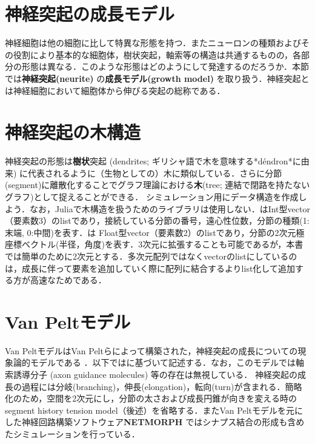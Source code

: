 \section{神経突起の成長モデル}
神経細胞は他の細胞に比して特異な形態を持つ．またニューロンの種類およびその役割により基本的な細胞体，樹状突起，軸索等の構造は共通するものの，各部分の形態は異なる．このような形態はどのようにして発達するのだろうか．本節では\textbf{神経突起(neurite)} の\textbf{成長モデル(growth model)} を取り扱う．神経突起とは神経細胞において細胞体から伸びる突起の総称である．
\section{神経突起の木構造}
神経突起の形態は\textbf{樹状}突起 (dendrites; ギリシャ語で木を意味する*déndron*に由来) に代表されるように（生物としての）木に類似している．さらに分節(segment)に離散化することでグラフ理論における\textbf{木}(tree; 連結で閉路を持たないグラフ)として捉えることができる．
シミュレーション用にデータ構造を作成しよう．なお，Juliaで木構造を扱うためのライブラリは使用しない．はInt型vector（要素数3）のlistであり，接続している分節の番号，遠心性位数，分節の種類(1: 末端, 0:中間)を表す．は Float型vector（要素数2）のlistであり，分節の2次元極座標ベクトル(半径，角度)を表す．3次元に拡張することも可能であるが，本書では簡単のために2次元とする．多次元配列ではなくvectorのlistにしているのは，成長に伴って要素を追加していく際に配列に結合するよりlist化して追加する方が高速なためである．
\section{Van Peltモデル}
Van PeltモデルはVan Peltらによって構築された，神経突起の成長についての現象論的モデルである \citep{Van_Pelt2002-vm}．以下では\citep{Koene2009-hv}に基づいて記述する．なお，このモデルでは軸索誘導分子 (axon guidance molecules) 等の存在は無視している．
神経突起の成長の過程には分岐(branching)，伸長(elongation)，転向(turn)が含まれる．簡略化のため，空間を2次元にし，分節の太さおよび成長円錐が向きを変える時のsegment history tension model（後述）を省略する．またVan Peltモデルを元にした神経回路構築ソフトウェア\textbf{NETMORPH} \citep{Koene2009-hv}ではシナプス結合の形成も含めたシミュレーションを行っている．
